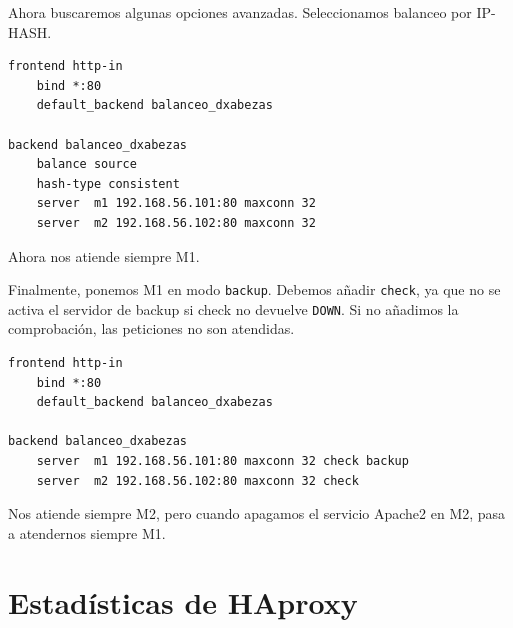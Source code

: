 \documentclass{article}
\begin{document}
Ahora buscaremos algunas opciones avanzadas. Seleccionamos balanceo por IP-HASH. 

\begin{Verbatim}[tabsize=4]
frontend http-in
	bind *:80
	default_backend balanceo_dxabezas

backend balanceo_dxabezas
	balance source
	hash-type consistent
	server  m1 192.168.56.101:80 maxconn 32
	server  m2 192.168.56.102:80 maxconn 32
\end{Verbatim}
Ahora nos atiende siempre M1.
    
Finalmente, ponemos M1 en modo \texttt{backup}. Debemos añadir \texttt{check}, ya que no se activa el servidor de
backup si check no devuelve \texttt{DOWN}. Si no añadimos la comprobación, las peticiones no son atendidas.
\begin{Verbatim}[tabsize=4]
frontend http-in
	bind *:80
	default_backend balanceo_dxabezas

backend balanceo_dxabezas
	server  m1 192.168.56.101:80 maxconn 32 check backup
	server  m2 192.168.56.102:80 maxconn 32 check
\end{Verbatim}
Nos atiende siempre M2, pero cuando apagamos el servicio Apache2 en M2, pasa a atendernos siempre M1.

\section{Estadísticas de HAproxy}
\end{document}
